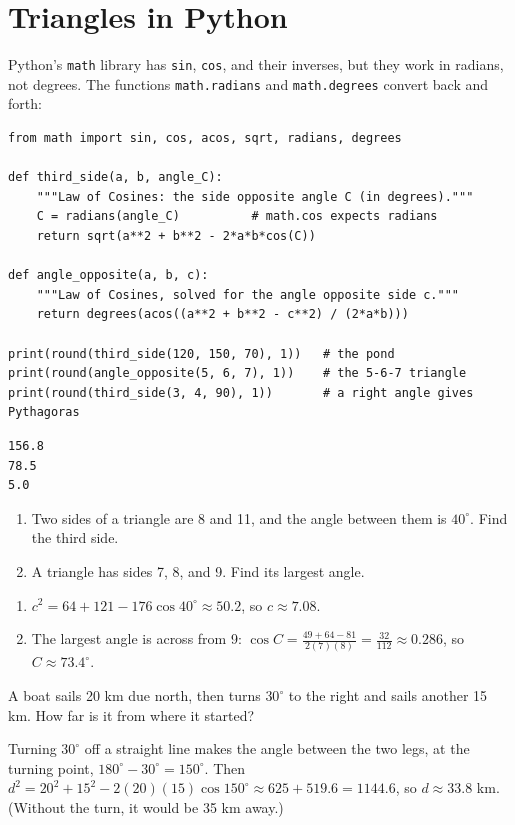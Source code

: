 \section{Triangles in Python}
Python's \texttt{math} library has \texttt{sin},
\texttt{cos}, and their inverses, but they work in radians, not degrees.
The functions \texttt{math.radians} and \texttt{math.degrees}
convert back and forth:
\begin{verbatim}
from math import sin, cos, acos, sqrt, radians, degrees

def third_side(a, b, angle_C):
    """Law of Cosines: the side opposite angle C (in degrees)."""
    C = radians(angle_C)          # math.cos expects radians
    return sqrt(a**2 + b**2 - 2*a*b*cos(C))

def angle_opposite(a, b, c):
    """Law of Cosines, solved for the angle opposite side c."""
    return degrees(acos((a**2 + b**2 - c**2) / (2*a*b)))

print(round(third_side(120, 150, 70), 1))   # the pond
print(round(angle_opposite(5, 6, 7), 1))    # the 5-6-7 triangle
print(round(third_side(3, 4, 90), 1))       # a right angle gives Pythagoras
\end{verbatim}
\begin{verbatim}
156.8
78.5
5.0
\end{verbatim}

\begin{Exercise}[title={Law of Cosines}, label=lc_sas]
\begin{enumerate}
\item Two sides of a triangle are 8 and 11, and the angle between them is $40^\circ$.
Find the third side.
\item A triangle has sides 7, 8, and 9. Find its largest angle.
\end{enumerate}
\end{Exercise}
\begin{Answer}[ref=lc_sas]
\begin{enumerate}
\item $c^2 = 64 + 121 - 176\cos 40^\circ \approx 50.2$, so $c \approx 7.08$.
\item The largest angle is across from 9:
$\cos C = \frac{49 + 64 - 81}{2(7)(8)} = \frac{32}{112} \approx 0.286$, so
$C \approx 73.4^\circ$.
\end{enumerate}
\end{Answer}

\begin{Exercise}[title={Off Course}, label=lc_ship]
A boat sails 20 km due north, then turns $30^\circ$ to the right and sails another
15 km. How far is it from where it started?
\end{Exercise}
\begin{Answer}[ref=lc_ship]
Turning $30^\circ$ off a straight line makes the angle between the two legs, at the
turning point, $180^\circ - 30^\circ = 150^\circ$. Then
$d^2 = 20^2 + 15^2 - 2(20)(15)\cos 150^\circ \approx 625 + 519.6 = 1144.6$, so
$d \approx 33.8$ km. (Without the turn, it would be 35 km away.)
\end{Answer}

